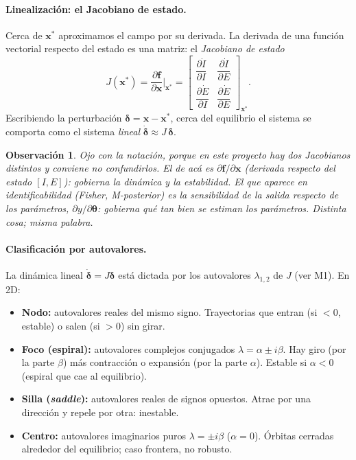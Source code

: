 \documentclass[11pt,a4paper]{article}
\newtheorem{remark}{Observación}
\newcommand{\thetavec}{\bm{\theta}}
\begin{document}
\paragraph{Linealización: el Jacobiano de estado.} Cerca de $\mathbf{x}^{*}$ aproximamos el campo por su derivada. La derivada de una función vectorial respecto del estado es una matriz: el \emph{Jacobiano de estado}
\begin{equation}
J(\mathbf{x}^{*}) = \frac{\partial \mathbf{f}}{\partial \mathbf{x}}\bigg|_{\mathbf{x}^{*}}
= \begin{bmatrix}
\dfrac{\partial \dot I}{\partial I} & \dfrac{\partial \dot I}{\partial E}\\[8pt]
\dfrac{\partial \dot E}{\partial I} & \dfrac{\partial \dot E}{\partial E}
\end{bmatrix}_{\mathbf{x}^{*}}.
\end{equation}
Escribiendo la perturbación $\bm{\delta}=\mathbf{x}-\mathbf{x}^{*}$, cerca del equilibrio el sistema se comporta como el sistema \emph{lineal} $\dot{\bm{\delta}}\approx J\,\bm{\delta}$.

\begin{remark}
Ojo con la notación, porque en este proyecto hay \emph{dos} Jacobianos distintos y conviene no confundirlos. El de acá es $\partial\mathbf{f}/\partial\mathbf{x}$ (derivada respecto del \emph{estado} $[I,E]$): gobierna la \emph{dinámica} y la estabilidad. El que aparece en identificabilidad (Fisher, M-posterior) es la sensibilidad de la salida respecto de los \emph{parámetros}, $\partial y/\partial\thetavec$: gobierna qué tan bien se \emph{estiman} los parámetros. Distinta cosa; misma palabra.
\end{remark}

\paragraph{Clasificación por autovalores.} La dinámica lineal $\dot{\bm{\delta}}=J\bm{\delta}$ está dictada por los autovalores $\lambda_{1,2}$ de $J$ (ver M1). En 2D:
\begin{itemize}[nosep,leftmargin=1.4em]
\item \textbf{Nodo:} autovalores reales del mismo signo. Trayectorias que entran (si $<0$, estable) o salen (si $>0$) sin girar.
\item \textbf{Foco (espiral):} autovalores complejos conjugados $\lambda=\alpha\pm i\beta$. Hay giro (por la parte $\beta$) más contracción o expansión (por la parte $\alpha$). Estable si $\alpha<0$ (espiral que cae al equilibrio).
\item \textbf{Silla (\emph{saddle}):} autovalores reales de signos opuestos. Atrae por una dirección y repele por otra: inestable.
\item \textbf{Centro:} autovalores imaginarios puros $\lambda=\pm i\beta$ ($\alpha=0$). Órbitas cerradas alrededor del equilibrio; caso frontera, no robusto.
\end{itemize}
\end{document}
